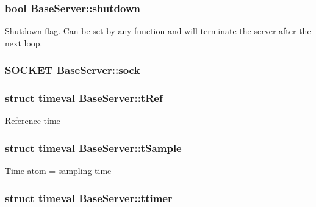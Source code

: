\hypertarget{classBaseServer_a7d1dd18825bf1ff1c7c7ec0a8903c340}{
\subsubsection[{shutdown}]{\setlength{\rightskip}{0pt plus 5cm}bool Base\-Server\-::shutdown\hspace{0.3cm}{\ttfamily [protected]}}}\label{classBaseServer_a7d1dd18825bf1ff1c7c7ec0a8903c340}
Shutdown flag. Can be set by any function and will terminate the server after the next loop. \hypertarget{classBaseServer_a8ab6dde541feb79b2315a4fb96918ce6}{
\subsubsection[{sock}]{\setlength{\rightskip}{0pt plus 5cm}S\-O\-C\-K\-E\-T Base\-Server\-::sock\hspace{0.3cm}{\ttfamily [protected]}}}\label{classBaseServer_a8ab6dde541feb79b2315a4fb96918ce6}
\hypertarget{classBaseServer_a577aa72c0ceda0fb61ae1ebdaca46540}{
\subsubsection[{t\-Ref}]{\setlength{\rightskip}{0pt plus 5cm}struct timeval Base\-Server\-::t\-Ref\hspace{0.3cm}{\ttfamily [protected]}}}\label{classBaseServer_a577aa72c0ceda0fb61ae1ebdaca46540}
Reference time \hypertarget{classBaseServer_a033ccd3b1b9218b8df7c5bac0f16b08e}{
\subsubsection[{t\-Sample}]{\setlength{\rightskip}{0pt plus 5cm}struct timeval Base\-Server\-::t\-Sample\hspace{0.3cm}{\ttfamily [protected]}}}\label{classBaseServer_a033ccd3b1b9218b8df7c5bac0f16b08e}
Time atom = sampling time \hypertarget{classBaseServer_acd804e8f5dbbf12372661674e9efd4a5}{
\subsubsection[{ttimer}]{\setlength{\rightskip}{0pt plus 5cm}struct timeval Base\-Server\-::ttimer\hspace{0.3cm}{\ttfamily [protected]}}}\label{classBaseServer_acd804e8f5dbbf12372661674e9efd4a5}
